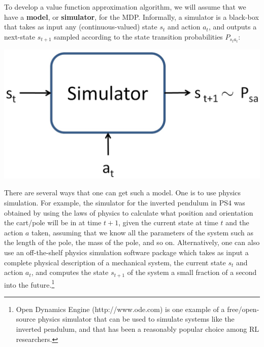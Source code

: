 \documentclass{article}
\begin{document}
To develop a value function approximation algorithm, we will assume that we have a {\bf model}, or {\bf simulator}, for the MDP.
Informally, a simulator is a black-box that takes as input any (continuous-valued) state $s_t$ and action $a_t$,
and outputs a next-state $s_{t+1}$ sampled according to the state transition probabilities
$P_{s_ta_t}$:
\begin{center}
\includegraphics[scale=0.2]{simulator.eps}
\end{center}

There are several ways that one can get such a model.  One is to use physics
simulation.  For example, the simulator for the inverted pendulum in PS4 was
obtained by using the laws of physics to calculate what position and
orientation the cart/pole will be in at time $t+1$, given the current state at
time $t$ and the action $a$ taken, assuming that we know all the parameters of
the system such as the length of the pole, the mass of the pole, and so on.
Alternatively, one can also use an off-the-shelf physics simulation software
package which takes as input a complete physical description of a mechanical
system, the current state $s_t$ and action $a_t$, and computes the state
$s_{t+1}$ of the system a small fraction of a second into the
future.\footnote{Open Dynamics Engine (http://www.ode.com) is one example of
a free/open-source physics simulator that can be used to simulate systems like the
inverted pendulum, and that has been a reasonably popular choice among RL
researchers.}
\end{document}
